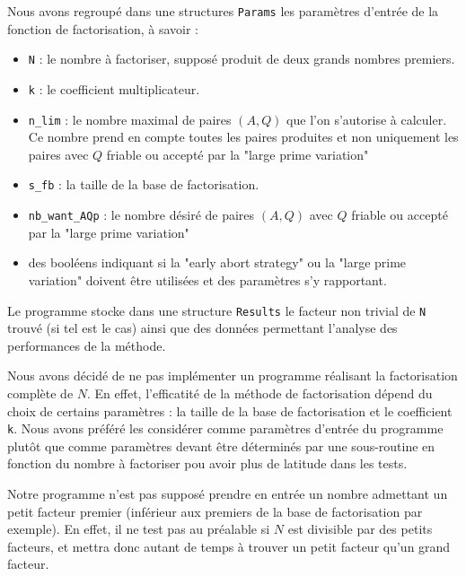 Nous avons regroupé dans une structures \texttt{Params} les paramètres d'entrée 
de la fonction de factorisation, à savoir :

\begin{itemize}
    \item \texttt{N} : le nombre à factoriser, supposé produit de deux grands
                       nombres premiers.
    \item \texttt{k} : le coefficient multiplicateur.
    \item \texttt{n\_lim} : le nombre maximal de paires $(A,Q)$ que l'on 
                             s'autorise à calculer. Ce nombre prend en compte
                             toutes les paires produites et non uniquement les
                             paires avec $Q$ friable ou accepté par la "large
                             prime variation"
    \item \texttt{s\_fb} : la taille de la base de factorisation. 
    \item \texttt{nb\_want\_AQp} : le nombre désiré de paires $(A,Q)$ avec $Q$ 
                                 friable ou accepté par la "large prime variation"
    \item des booléens indiquant si la "early abort strategy" ou la "large prime 
          variation" doivent être utilisées et des paramètres s'y rapportant.

\end{itemize}

Le programme stocke dans une structure \texttt{Results} le facteur non trivial
de \texttt{N} trouvé (si tel est le cas) ainsi que des données permettant 
l'analyse des performances de la méthode.

\begin{remarque}
Nous avons décidé de ne pas implémenter un programme réalisant la factorisation
complète de $N$. En effet, l'efficatité de la méthode de factorisation dépend
du choix de certains paramètres : la taille de la base de factorisation et le
coefficient \texttt{k}. Nous avons préféré les considérer comme paramètres 
d'entrée du programme plutôt que comme paramètres devant être déterminés par 
une sous-routine en fonction du nombre à factoriser pou avoir plus de latitude 
dans les tests. 
\end{remarque}

\begin{remarque}
Notre programme n'est pas supposé prendre en entrée un nombre admettant un petit
facteur premier (inférieur aux premiers de la base de factorisation par exemple).
En effet, il ne test pas au préalable si $N$ est divisible par des petits facteurs, 
et mettra donc autant de temps à trouver un petit facteur qu'un grand facteur.
\end{remarque}
